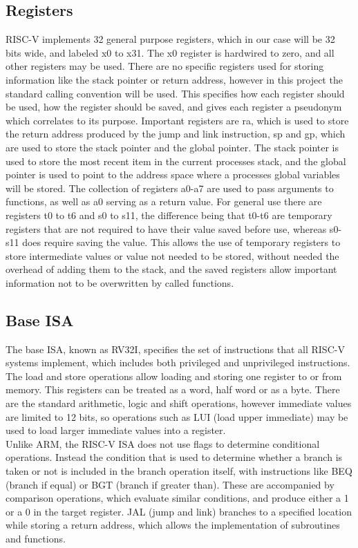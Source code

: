 \subsection{Registers}
RISC-V implements 32 general purpose registers, which in our case will be 32 bits wide, and labeled x0 to x31. The x0 register is hardwired to zero, and all other registers may be used. There are no specific registers used for storing information like the stack pointer or return address, however in this project the standard calling convention will be used. This specifies how each register should be used, how the register should be saved, and gives each register a pseudonym which correlates to its purpose. Important registers are ra, which is used to store the return address produced by the jump and link instruction, sp and gp, which are used to store the stack pointer and the global pointer. The stack pointer is used to store the most recent item in the current processes stack, and the global pointer is used to point to the address space where a processes global variables will be stored. The collection of registers a0-a7 are used to pass arguments to functions, as well as a0 serving as a return value. For general use there are registers t0 to t6 and s0 to s11, the difference being that t0-t6 are temporary registers that are not required to have their value saved before use, whereas s0-s11 does require saving the value. This allows the use of temporary registers to store intermediate values or value not needed to be stored, without needed the overhead of adding them to the stack, and the saved registers allow important information not to be overwritten by called functions\cite{riscv_unpriv}.
\subsection{Base ISA}
The base ISA, known as RV32I, specifies the set of instructions that all RISC-V systems implement, which includes both privileged and unprivileged instructions. The load and store operations allow loading and storing one register to or from memory. This registers can be treated as a word, half word or as a byte. There are the standard arithmetic, logic and shift operations, however immediate values are limited to 12 bits, so operations such as LUI (load upper immediate) may be used to load larger immediate values into a register.\\
Unlike ARM, the RISC-V ISA does not use flags to determine conditional operations. Instead the condition that is used to determine whether a branch is taken or not is included in the branch operation itself, with instructions like BEQ (branch if equal) or BGT (branch if greater than). These are accompanied by comparison operations, which evaluate similar conditions, and produce either a 1 or a 0 in the target register. JAL (jump and link) branches to a specified location while storing a return address, which allows the implementation of subroutines and functions\cite{riscv_unpriv}.
